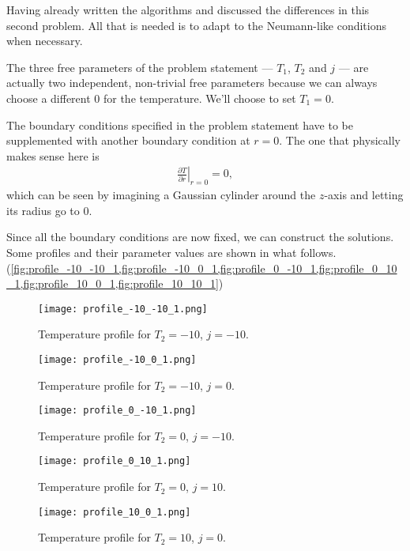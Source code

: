 \documentclass[10pt,a4paper,twocolumn]{article}
\begin{document}
Having already written the algorithms and discussed the differences in this second problem. All that is needed is to adapt to the Neumann-like conditions when necessary.

The three free parameters of the problem statement --- $T_1$, $T_2$ and $j$ --- are actually two independent,  non-trivial free parameters because we can always choose a different $0$ for the temperature. We'll  choose to set $T_1=0$.

The boundary conditions specified in the problem statement have to be supplemented with another boundary condition at $r=0$. The one that physically makes sense here is
%
\begin{align}
    \left. \frac{\partial T}{\partial r} \right|_{r=0} = 0,
\end{align}
%
which can be seen by imagining a Gaussian cylinder around the $z$-axis and letting its radius go to $0$.

Since all the boundary conditions are now fixed, we can construct the solutions. Some profiles and their parameter values are shown in what follows. (\cref{fig:profile_-10_-10_1,fig:profile_-10_0_1,fig:profile_0_-10_1,fig:profile_0_10_1,fig:profile_10_0_1,fig:profile_10_10_1})

\begin{figure}[!ht]
    \centering
    \texttt{[image: profile\_-10\_-10\_1.png]}
    \caption{Temperature profile for $T_2=-10$, $j=-10$.}
    \label{fig:profile_-10_-10_1}
\end{figure}

\begin{figure}[!hb]
    \centering
    \texttt{[image: profile\_-10\_0\_1.png]}
    \caption{Temperature profile for $T_2=-10$, $j=0$.}
    \label{fig:profile_-10_0_1}
\end{figure}


\begin{figure}[!ht]
    \centering
    \texttt{[image: profile\_0\_-10\_1.png]}
    \caption{Temperature profile for $T_2=0$, $j=-10$.}
    \label{fig:profile_0_-10_1}
\end{figure}

\begin{figure}[!hb]
    \centering
    \texttt{[image: profile\_0\_10\_1.png]}
    \caption{Temperature profile for $T_2=0$, $j=10$.}
    \label{fig:profile_0_10_1}
\end{figure}


\begin{figure}[!ht]
    \centering
    \texttt{[image: profile\_10\_0\_1.png]}
    \caption{Temperature profile for $T_2=10$, $j=0$.}
    \label{fig:profile_10_0_1}
\end{figure}
\end{document}
